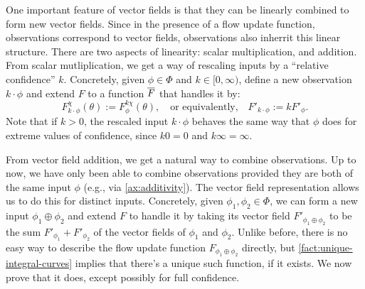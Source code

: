 One important feature of vector fields is that they
can be linearly combined to form new vector fields.
Since in the presence of a flow update function,
observations correspond to vector fields,
observations also inherrit this linear structure.
%
There are two aspects of linearity: scalar multiplication, and addition.
From scalar mutliplication, we get a way of rescaling
inputs
by a ``relative confidence'' $k
$.
Concretely, given $\phi \in \Phi$ and $k \in [0,\infty)$,
define a new observation
$k\cdot\phi$
and extend $F$ to
a function $\overline F$ that handles it by:
\[
	F^{\chi}_{k\cdot\phi}(\theta) := F^{k\chi}_{\phi}(\theta)
	,\quad\text{or equivalently,}\quad
	F'_{k\cdot \phi} := k F'_{\phi}
	.
\]
Note that if $k > 0$, the rescaled input
$k\cdot \phi$ behaves the same way that $\phi$
does for extreme values of confidence,
since $k 0 = 0$ and $k\infty = \infty$.



From vector field addition, we get a natural way to combine observations.
Up to now, we have only been able to combine observations provided they are
both of the same input $\phi$ (e.g., via \cref{ax:additivity}).
The vector field representation allows us to do this for distinct inputs.
Concretely,
given $\phi_1, \phi_2 \in \Phi$, we can form a new input
$\phi_1 \oplus \phi_2$
and extend $F$ to handle it by taking
its vector field
$F'_{\phi_1 \oplus \phi_2}$
to be the sum $F'_{\phi_1} + F'_{\phi_2}$ of the vector fields of $\phi_1 $ and $\phi_2$.
Unlike before, there is no easy way to describe the
flow update function
$F_{\phi_1\oplus\phi_2}$ directly,
but \cref{fact:unique-integral-curves} implies that there's a unique
such function, if it exists.
We now prove that it does, except possibly for full confidence.

